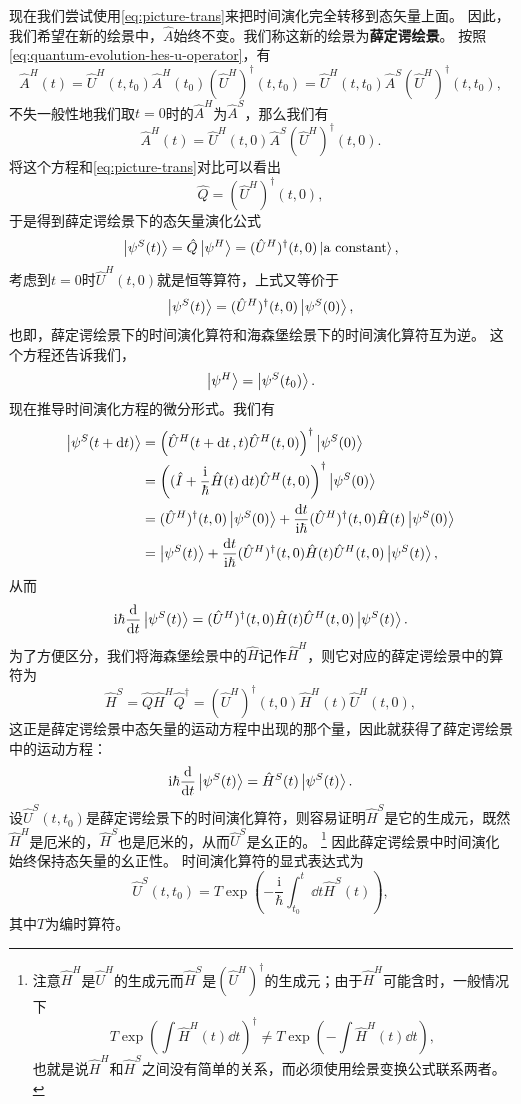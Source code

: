 \documentclass[UTF8, a4paper]{ctexart}
\newcommand*{\ii}{\mathrm{i}}
\begin{document}
现在我们尝试使用\eqref{eq:picture-trans}来把时间演化完全转移到态矢量上面。
因此，我们希望在新的绘景中，$\hat{A}$始终不变。我们称这新的绘景为\textbf{薛定谔绘景}。
按照\eqref{eq:quantum-evolution-hes-u-operator}，有
\[
    \hat{A}^H(t) = \hat{U}^H(t, t_0) \hat{A}^H (t_0) (\hat{U}^H)^\dagger(t, t_0) = \hat{U}^H(t, t_0) \hat{A}^S( \hat{U}^H)^\dagger(t, t_0),
\]
不失一般性地我们取$t=0$时的$\hat{A}^H$为$\hat{A}^S$，那么我们有
\[
    \hat{A}^H (t) = \hat{U}^H(t, 0) \hat{A}^S( \hat{U}^H)^\dagger(t, 0).
\]
将这个方程和\eqref{eq:picture-trans}对比可以看出
\[
    \hat{Q} = (\hat{U}^H)^\dagger(t, 0),
\]
于是得到薛定谔绘景下的态矢量演化公式
\[
    \ket{\psi^S(t)} = \hat{Q} \ket{\psi^H} = (\hat{U}^H)^\dagger (t, 0) \ket{\text{a constant}},
\]
考虑到$t=0$时$\hat{U}^H (t, 0)$就是恒等算符，上式又等价于
\[
    \ket{\psi^S(t)} = (\hat{U}^H)^\dagger (t, 0) \ket{\psi^S (0)},
\]
也即，薛定谔绘景下的时间演化算符和海森堡绘景下的时间演化算符互为逆。
这个方程还告诉我们，
\[
    \ket{\psi^H} = \ket{\psi^S(t_0)}.
\]
现在推导时间演化方程的微分形式。我们有
\[
    \begin{aligned}
        \ket{\psi^S (t + \dd{t})} &= \left( \hat{U}^H (t + \dd{t}, t) \hat{U}^H (t, 0)  \right)^\dagger \ket{\psi^S(0)} \\
        &= \left( (\hat{I} + \frac{\ii}{\hbar} \hat{H}(t) \dd{t})   \hat{U}^H (t, 0) \right)^\dagger \ket{\psi^S (0)} \\
        &= (\hat{U}^H)^\dagger (t, 0) \ket{\psi^S (0)} + \frac{\dd{t}}{\ii \hbar} (\hat{U}^H)^\dagger (t, 0) \hat{H}(t) \ket{\psi^S (0)} \\
        &= \ket{\psi^S (t)} + \frac{\dd{t}}{\ii \hbar} (\hat{U}^H)^\dagger (t, 0) \hat{H}(t) \hat{U}^H (t, 0) \ket{\psi^S (t)},
    \end{aligned}
\]
从而
\[
    \ii \hbar \dv{t} \ket{\psi^S (t)} = (\hat{U}^H)^\dagger (t, 0) \hat{H}(t) \hat{U}^H (t, 0) \ket{\psi^S (t)}.
\]
为了方便区分，我们将海森堡绘景中的$\hat{H}$记作$\hat{H}^H$，则它对应的薛定谔绘景中的算符为
\[
    \hat{H}^S = \hat{Q} \hat{H}^H \hat{Q}^\dagger = (\hat{U}^H)^\dagger (t, 0) \hat{H}^H(t) \hat{U}^H (t, 0), 
\]
这正是薛定谔绘景中态矢量的运动方程中出现的那个量，因此就获得了薛定谔绘景中的运动方程：
\begin{equation}
    \ii \hbar \dv{t} \ket{\psi^S(t)} = \hat{H}^S (t) \ket{\psi^S(t)}.
\end{equation}
设$\hat{U}^S(t, t_0)$是薛定谔绘景下的时间演化算符，则容易证明$\hat{H}^S$是它的生成元，既然$\hat{H}^H$是厄米的，$\hat{H}^S$也是厄米的，从而$\hat{U}^S$是幺正的。%
\footnote{注意$\hat{H}^H$是$\hat{U}^H$的生成元而$\hat{H}^S$是$(\hat{U}^H)^\dagger$的生成元；由于$\hat{H}^H$可能含时，一般情况下
\[
    T \exp(\int \hat{H}^H (t) \dd{t})^\dagger \neq T \exp(- \int \hat{H}^H (t) \dd{t}),
\]
也就是说$\hat{H}^H$和$\hat{H}^S$之间没有简单的关系，而必须使用绘景变换公式联系两者。
}
因此薛定谔绘景中时间演化始终保持态矢量的幺正性。
时间演化算符的显式表达式为
\begin{equation}
    \hat{U}^S(t, t_0) = T \exp \left( - \frac{\ii}{\hbar} \int_{t_0}^t \dd{t} \hat{H}^S(t) \right),
\end{equation}
其中$T$为编时算符。
\end{document}
